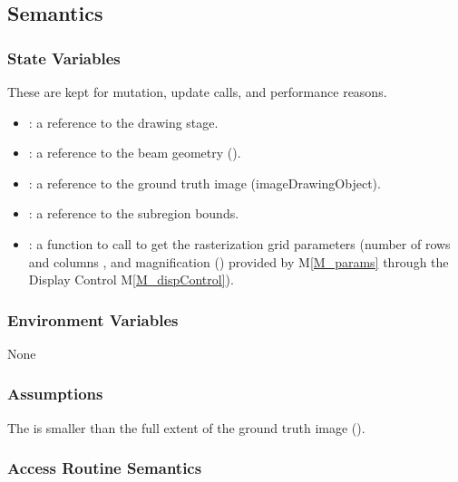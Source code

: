 \documentclass[12pt, titlepage]{article}
\newcommand{\mref}[1]{M\ref{#1}}
\begin{document}
\subsection{Semantics}

\subsubsection{State Variables}
These are kept for mutation, update calls, and performance reasons.
\begin{itemize}
  \item {}: a reference to the drawing stage.
  \item {}: a reference to the beam geometry ().
  \item {}: a reference to the ground truth image (imageDrawingObject).
  \item {}: a reference to the subregion bounds.
  \item {}: a function to call to get the rasterization
    grid parameters (number of rows  and columns ,
    and magnification () 
    provided by \mref{M_params}
    through the Display Control \mref{M_dispControl}).
\end{itemize}

\subsubsection{Environment Variables}
None

\subsubsection{Assumptions}
The  is smaller than the full extent of the ground truth image
().

\subsubsection{Access Routine Semantics}
\end{document}
